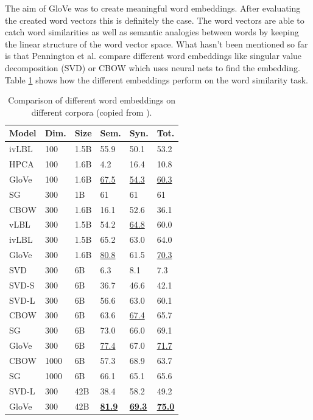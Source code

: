 The aim of GloVe was to create meaningful word embeddings. After evaluating the created word vectors
this is definitely the case. The word vectors are able to catch word similarities as well as
semantic analogies between words by keeping the linear structure of the word vector space. What hasn't 
been mentioned so far is that Pennington et al. compare different word embeddings like singular value decomposition (SVD) or CBOW 
which uses neural nets to find the embedding. Table \ref{tab:comparison} shows how the different embeddings
perform on the word similarity task. \\

\begin{table}[!h]
\centering
\begin{tabular}{@{}llllll@{}}
\hline
\textbf{Model} & \textbf{Dim.} & \textbf{Size} & \textbf{Sem.} & \textbf{Syn.} & \textbf{Tot.}\\
\hline\hline
ivLBL & 100 & 1.5B & 55.9 & 50.1 & 53.2\\
HPCA & 100 & 1.6B & 4.2 & 16.4 & 10.8\\
GloVe & 100 & 1.6B & \underline{67.5} & \underline{54.3} & \underline{60.3}\\
\hline
SG & 300 & 1B & 61 & 61 & 61\\
CBOW & 300 & 1.6B & 16.1 & 52.6 & 36.1\\
vLBL & 300 & 1.5B & 54.2 & \underline{64.8} & 60.0\\
ivLBL & 300 & 1.5B & 65.2 & 63.0 & 64.0\\
GloVe & 300 & 1.6B & \underline{80.8} & 61.5 & \underline{70.3}\\
\hline
SVD & 300 & 6B & 6.3 & 8.1 & 7.3\\
SVD-S & 300 & 6B & 36.7 & 46.6 & 42.1\\
SVD-L & 300 & 6B & 56.6 & 63.0 & 60.1\\
CBOW & 300 & 6B & 63.6 & \underline{67.4} & 65.7\\
SG & 300 & 6B & 73.0 & 66.0 & 69.1\\
GloVe & 300 & 6B & \underline{77.4} & 67.0 & \underline{71.7}\\
\hline
CBOW & 1000 & 6B & 57.3 & 68.9 & 63.7\\
SG & 1000 & 6B & 66.1 & 65.1 & 65.6\\
SVD-L & 300 & 42B & 38.4 & 58.2 & 49.2\\
GloVe & 300 & 42B & \underline{\textbf{81.9}} & \underline{\textbf{69.3}} & \underline{\textbf{75.0}}\\
\hline
\end{tabular}
\caption{Comparison of different word embeddings on different corpora (copied from \cite{pennington2014glove}).}
\label{tab:comparison}
\end{table}


